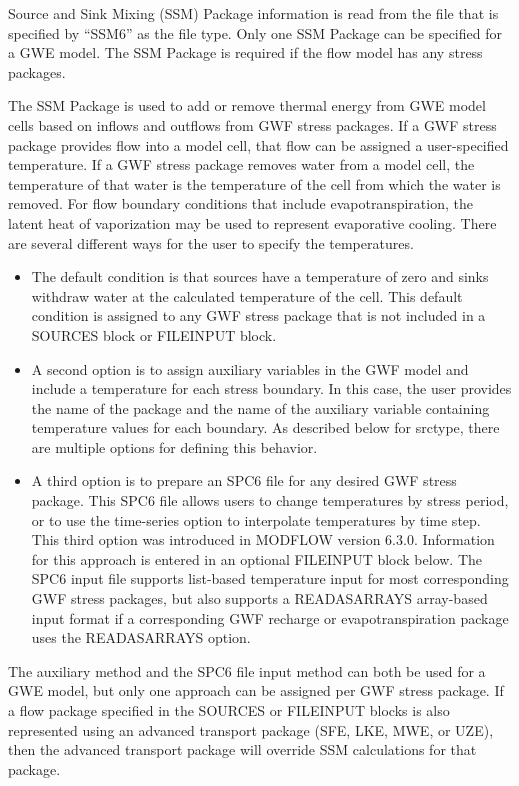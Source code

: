 Source and Sink Mixing (SSM) Package information is read from the file that is specified by ``SSM6'' as the file type.  Only one SSM Package can be specified for a GWE model.  The SSM Package is required if the flow model has any stress packages.

The SSM Package is used to add or remove thermal energy from GWE model cells based on inflows and outflows from GWF stress packages.  If a GWF stress package provides flow into a model cell, that flow can be assigned a user-specified temperature.  If a GWF stress package removes water from a model cell, the temperature of that water is the temperature of the cell from which the water is removed.  For flow boundary conditions that include evapotranspiration, the latent heat of vaporization may be used to represent evaporative cooling.  There are several different ways for the user to specify the temperatures.  

\begin{itemize}
\item The default condition is that sources have a temperature of zero and sinks withdraw water at the calculated temperature of the cell.  This default condition is assigned to any GWF stress package that is not included in a SOURCES block or FILEINPUT block.
\item A second option is to assign auxiliary variables in the GWF model and include a temperature for each stress boundary.  In this case, the user provides the name of the package and the name of the auxiliary variable containing temperature values for each boundary.  As described below for srctype, there are multiple options for defining this behavior.
\item A third option is to prepare an SPC6 file for any desired GWF stress package.  This SPC6 file allows users to change temperatures by stress period, or to use the time-series option to interpolate temperatures by time step.  This third option was introduced in MODFLOW version 6.3.0.  Information for this approach is entered in an optional FILEINPUT block below.  The SPC6 input file supports list-based temperature input for most corresponding GWF stress packages, but also supports a READASARRAYS array-based input format if a corresponding GWF recharge or evapotranspiration package uses the READASARRAYS option.
\end{itemize}

\noindent The auxiliary method and the SPC6 file input method can both be used for a GWE model, but only one approach can be assigned per GWF stress package.   If a flow package specified in the SOURCES or FILEINPUT blocks is also represented using an advanced transport package (SFE, LKE, MWE, or UZE), then the advanced transport package will override SSM calculations for that package.

